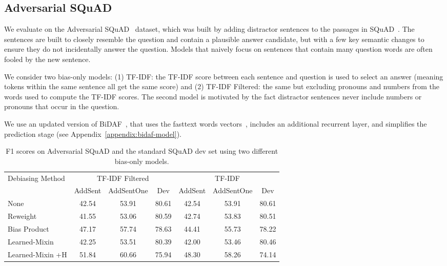 \documentclass[11pt,a4paper]{article}
\begin{document}
\subsection{Adversarial SQuAD}
\label{sect:adverserial_squad}
 We evaluate on the Adversarial SQuAD~\cite{adversarial_squad} dataset, which was built by adding distractor sentences to the passages in SQuAD~\cite{squad}. The sentences are built to closely resemble the question and contain a plausible answer candidate, but with a few key semantic changes to ensure they do not incidentally answer the question. Models that naively focus on sentences that contain many question words are often fooled by the new sentence.

 We consider two bias-only models: (1) TF-IDF: the TF-IDF score between each sentence and question is used to select an answer (meaning tokens within the same sentence all get the same score) and (2) TF-IDF Filtered: the same but excluding pronouns and numbers from the words used to compute the TF-IDF scores. The second model is motivated by the fact distractor sentences never include numbers or pronouns that occur in the question.


 We use an updated version of BiDAF~\cite{seo2016bidirectional}, that uses the fasttext words vectors~\cite{fasttext_word_vectors}, includes an additional recurrent layer, and simplifies the prediction stage (see Appendix~\ref{appendix:bidaf-model}).

\begin{table*}[]
\centering
    \tablefont
\begin{tabular}{lcccccc} \toprule
\multirow{2}{*}{Debiasing Method} & \multicolumn{3}{c}{TF-IDF Filtered} & \multicolumn{3}{c}{TF-IDF}\\
\cmidrule(r){2-4} \cmidrule(l){5-7}
 & AddSent & AddSentOne & Dev & AddSent & AddSentOne & Dev\\ \midrule
None & 42.54 & 53.91 & 80.61 & 42.54 & 53.91 & 80.61 \\
Reweight & 41.55 & 53.06 & 80.59 & 42.74 & 53.83 & 80.51 \\
Bias Product & 47.17 & 57.74 & 78.63 & 44.41 & 55.73 & 78.22 \\
Learned-Mixin & 42.25 & 53.51 & 80.39 & 42.00 & 53.46 & 80.46 \\
Learned-Mixin +H & 51.84 & 60.66 & 75.94 & 48.30 & 58.26 & 74.14 \\
\bottomrule
\end{tabular}
    \caption{F1 scores on Adversarial SQuAD and the standard SQuAD dev set using two different bias-only models.}
\label{fig:adversarial_squad}
\end{table*}
\end{document}
